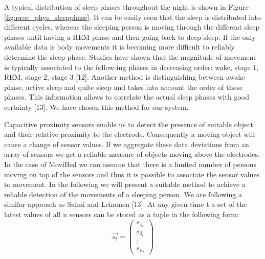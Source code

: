 A typical distribution of sleep phases throughout the night is shown in Figure \ref{fig:proc_phys_sleepphase}. It can be easily seen that the sleep is distributed into different cycles, whereas the sleeping person is moving through the different sleep phases until having a REM phase and then going back to deep sleep. If the only available data is body movements it is becoming more difficult to reliably determine the sleep phase. Studies have shown that the magnitude of movement is typically associated to the follow-ing phases in decreasing order: wake, stage 1, REM, stage 2, stage 3 [12]. Another method is distinguishing between awake phase, active sleep and quite sleep and takes into account the order of those phases. This information allows to correlate the actual sleep phases with good certainty [13]. We have chosen this method for our system.

Capacitive proximity sensors enable us to detect the presence of suitable object and their relative proximity to the electrode. Consequently a moving object will cause a change of sensor values. If we aggregate these data deviations from an array of sensors we get a reliable measure of objects moving above the electrodes. In the case of MoviBed we can assume that there is a limited number of persons moving on top of the sensors and thus it is possible to associate the sensor values to movement. In the following we will present a suitable method to achieve a reliable detection of the movements of a sleeping person. We are following a similar approach as Salmi and Leinonen [13].
At any given time t a set of the latest values of all n sensors can be stored as a tuple in the following form: 
\begin{equation}
\overrightarrow{s_t}=\begin{pmatrix}
s_{1_t}\\ 
s_{2_t}\\ 
\vdots \\ 
s_{n_t}
\end{pmatrix}
\end{equation} 

